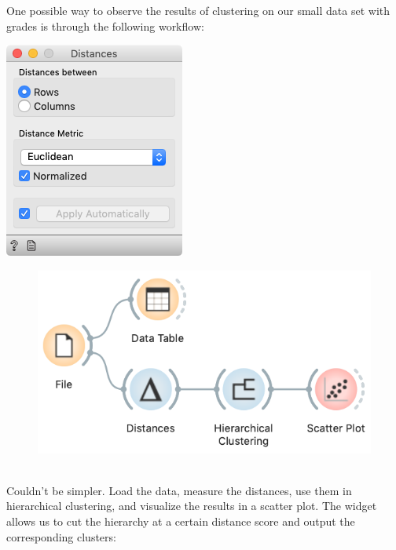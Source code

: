 \clearpage

One possible way to observe the results of clustering on our small data set with grades is through the following workflow:

\begin{marginfigure}
    \centering
    \includegraphics[scale=0.4]{distances.png}
\end{marginfigure}

\begin{figure}[h]
    \centering
    \includegraphics[scale=0.4]{workflow_clustering.png}
    \caption{$\;$} %
\end{figure}

Couldn’t be simpler. Load the data, measure the distances, use them in hierarchical clustering, and visualize the results in a scatter plot. The  widget allows us to cut the hierarchy at a certain distance score and output the corresponding clusters:


